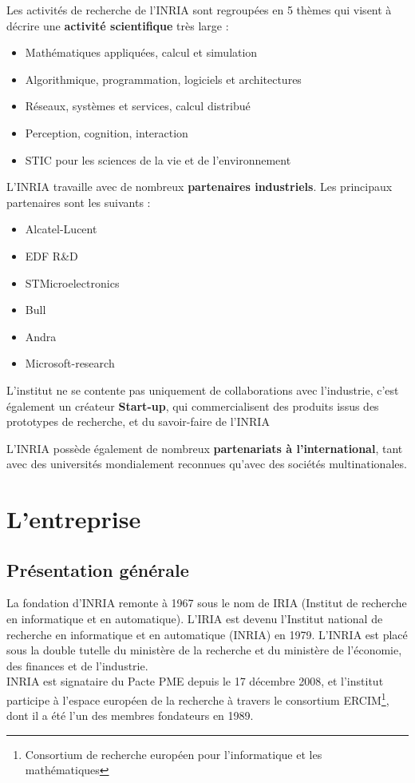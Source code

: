 \documentclass[a4paper, 11pt]{report}
\begin{document}
  Les activités de recherche de l'INRIA sont regroupées en 5 thèmes qui visent
  à décrire une \textbf{activité scientifique} très large :
  \begin{itemize}
    \item Mathématiques appliquées, calcul et simulation
    \item Algorithmique, programmation, logiciels et architectures
    \item Réseaux, systèmes et services, calcul distribué
    \item Perception, cognition, interaction
    \item STIC pour les sciences de la vie et de l'environnement \\
  \end{itemize}

  L'INRIA travaille avec de nombreux \textbf{partenaires industriels}.
  Les principaux partenaires sont les suivants :
  \begin{itemize}
    \item Alcatel-Lucent
    \item EDF R\&D
    \item STMicroelectronics
    \item Bull
    \item Andra
    \item Microsoft-research \\
  \end{itemize}

  L'institut ne se contente pas uniquement de collaborations avec l'industrie,
  c'est également un créateur \textbf{Start-up}, qui commercialisent des
  produits issus des prototypes de recherche, et du savoir-faire de l'INRIA

  L'INRIA possède également de nombreux \textbf{partenariats à
  l'international}, tant avec des universités mondialement reconnues qu'avec
  des sociétés multinationales.

  \section{L'entreprise}
    \subsection{Présentation générale}
    La fondation d'INRIA remonte à 1967 sous le nom de IRIA (Institut de
    recherche en informatique et en automatique). L'IRIA est devenu l'Institut
    national de recherche en informatique et en automatique (INRIA) en 1979.
    L'INRIA est placé sous la double tutelle du ministère de la recherche et
    du ministère de l'économie, des finances et de l'industrie. \\
    INRIA est signataire du Pacte PME depuis le 17 décembre 2008, et l'institut
    participe à l'espace européen de la recherche à travers le consortium
    ERCIM\footnote{Consortium de recherche européen pour l'informatique et les mathématiques}, dont il a été l'un des membres fondateurs en 1989.
\end{document}
